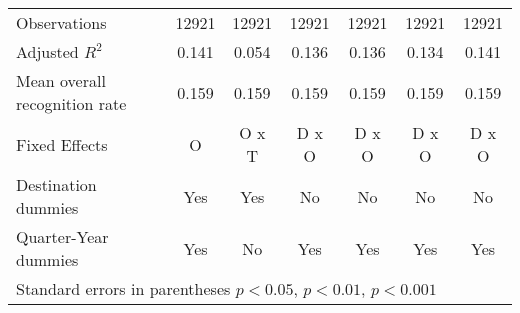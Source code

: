 \begin{table}[!ht]
\begin{tabular}{l*{6}{c}}
\hline
Observations        &       12921         &       12921         &       12921         &       12921         &       12921         &       12921         \\
Adjusted \(R^{2}\)  &       0.141         &       0.054         &       0.136         &       0.136         &       0.134         &       0.141         \\
Mean overall recognition rate&       0.159         &       0.159         &       0.159         &       0.159         &       0.159         &       0.159         \\
Fixed Effects       &           O         &       O x T         &       D x O         &       D x O         &       D x O         &       D x O         \\
Destination dummies &         Yes         &         Yes         &          No         &          No         &          No         &          No         \\
Quarter-Year dummies&         Yes         &          No         &         Yes         &         Yes         &         Yes         &         Yes         \\
\hline\hline
\multicolumn{7}{l}{ Standard errors in parentheses \sym{*} \(p<0.05\), \sym{**} \(p<0.01\), \sym{***} \(p<0.001\)}\\
\end{tabular}
\end{table}
